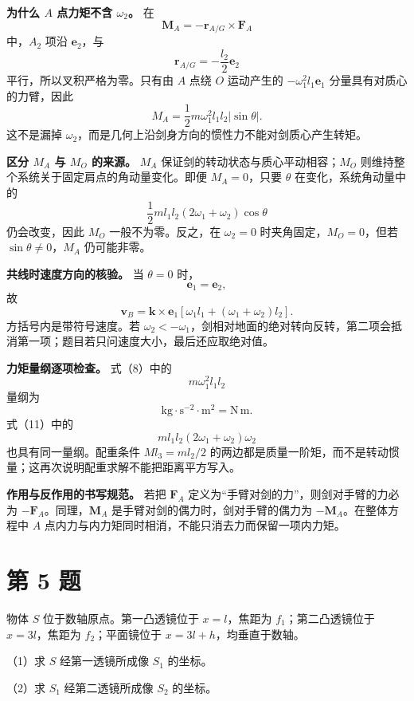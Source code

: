 \documentclass[12pt,a4paper,UTF8]{ctexart}
\begin{document}
\textbf{为什么 \(A\) 点力矩不含 \(\omega_2\)。} 在 \[
\boldsymbol M_A
=-\boldsymbol r_{A/G}\times\boldsymbol F_A
\] 中，\(A_2\) 项沿 \(\boldsymbol e_2\)，与 \[
\boldsymbol r_{A/G}=-\frac{l_2}{2}\boldsymbol e_2
\] 平行，所以叉积严格为零。只有由 \(A\) 点绕 \(O\) 运动产生的
\(-\omega_1^2l_1\boldsymbol e_1\) 分量具有对质心的力臂，因此 \[
M_A=\frac12m\omega_1^2l_1l_2|\sin\theta|.
\] 这不是漏掉
\(\omega_2\)，而是几何上沿剑身方向的惯性力不能对剑质心产生转矩。

\textbf{区分 \(M_A\) 与 \(M_O\) 的来源。} \(M_A\)
保证剑的转动状态与质心平动相容；\(M_O\)
则维持整个系统关于固定肩点的角动量变化。即便 \(M_A=0\)，只要 \(\theta\)
在变化，系统角动量中的 \[
\frac12ml_1l_2(2\omega_1+\omega_2)\cos\theta
\] 仍会改变，因此 \(M_O\) 一般不为零。反之，在 \(\omega_2=0\)
时夹角固定，\(M_O=0\)，但若 \(\sin\theta\ne0\)，\(M_A\) 仍可能非零。

\textbf{共线时速度方向的核验。} 当 \(\theta=0\) 时， \[
\boldsymbol e_1=\boldsymbol e_2,
\] 故 \[
\boldsymbol v_B
=\boldsymbol k\times\boldsymbol e_1
\left[
\omega_1l_1+(\omega_1+\omega_2)l_2
\right].
\] 方括号内是带符号速度。若
\(\omega_2<-\omega_1\)，剑相对地面的绝对转向反转，第二项会抵消第一项；题目若只问速度大小，最后还应取绝对值。

\textbf{力矩量纲逐项检查。} 式（8）中的 \[
m\omega_1^2l_1l_2
\] 量纲为 \[
\mathrm{kg}\cdot\mathrm{s^{-2}}\cdot\mathrm m^2
=\mathrm{N\,m}.
\] 式（11）中的 \[
ml_1l_2(2\omega_1+\omega_2)\omega_2
\] 也具有同一量纲。配重条件 \(Ml_3=ml_2/2\)
的两边都是质量一阶矩，而不是转动惯量；这再次说明配重求解不能把距离平方写入。

\textbf{作用与反作用的书写规范。} 若把 \(\boldsymbol F_A\)
定义为``手臂对剑的力''，则剑对手臂的力必为
\(-\boldsymbol F_A\)。同理，\(\boldsymbol M_A\)
是手臂对剑的偶力时，剑对手臂的偶力为 \(-\boldsymbol M_A\)。在整体方程中
\(A\) 点内力与内力矩同时相消，不能只消去力而保留一项内力矩。

\newpage

\section{第 5 题}\label{ux7b2c-5-ux9898}

物体 \(S\) 位于数轴原点。第一凸透镜位于 \(x=l\)，焦距为
\(f_1\)；第二凸透镜位于 \(x=3l\)，焦距为 \(f_2\)；平面镜位于
\(x=3l+h\)，均垂直于数轴。

（1）求 \(S\) 经第一透镜所成像 \(S_1\) 的坐标。

（2）求 \(S_1\) 经第二透镜所成像 \(S_2\) 的坐标。
\end{document}
